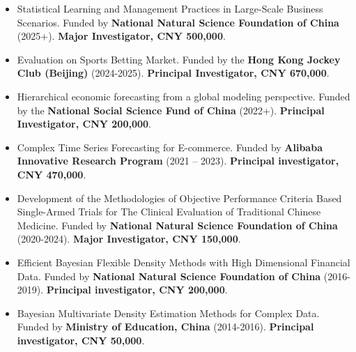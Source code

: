 \documentclass[twoside,a4paper]{article}
\begin{document}
\begin{itemize}

\item Statistical Learning and Management Practices in Large-Scale Business Scenarios. Funded by \textbf{National Natural Science Foundation of China} (2025+). \textbf{Major Investigator, CNY 500,000}.

\item Evaluation on Sports Betting Market. Funded by the \textbf{Hong Kong Jockey Club (Beijing)} (2024-2025). \textbf{Principal Investigator, CNY 670,000}.

\item Hierarchical economic forecasting from a global modeling perspective. Funded by the \textbf{National Social Science Fund of China} (2022+). \textbf{Principal Investigator, CNY 200,000}.

\item Complex Time Series Forecasting for E-commerce. Funded by \textbf{Alibaba Innovative Research Program} (2021 -- 2023). \textbf{Principal investigator, CNY 470,000}.

\item Development of the Methodologies of Objective Performance Criteria Based Single-Armed Trials for The Clinical Evaluation of Traditional Chinese Medicine. Funded by \textbf{National Natural Science Foundation of China} (2020-2024). \textbf{Major Investigator, CNY 150,000}.

\item Efficient Bayesian Flexible Density Methods with High Dimensional Financial Data. Funded by \textbf{National Natural Science Foundation of China} (2016-2019). \textbf{Principal investigator, CNY 200,000}.

\item Bayesian Multivariate Density Estimation Methods for Complex Data. Funded by \textbf{Ministry of Education, China} (2014-2016). \textbf{Principal investigator, CNY 50,000}.

\end{itemize}
\end{document}
